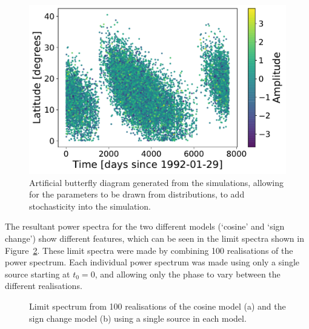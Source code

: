 \begin{figure}[ht!]
	\centering
	\includegraphics[width=0.85\columnwidth]{24h_fake_butterfly.pdf}
	\caption{Artificial butterfly diagram generated from the simulations, allowing for the parameters to be drawn from distributions, to add stochasticity into the simulation.}
	\label{fig:fake_butterfly}
\end{figure}


The resultant power spectra for the two different models (`cosine' and `sign change') show different features, which can be seen in the limit spectra shown in Figure~\ref{fig:artificial_LS}. These limit spectra were made by combining 100 realisations of the power spectrum. Each individual power spectrum was made using only a single source starting at $t_0 = 0$, and allowing only the phase to vary between the different realisations.

\begin{figure}[ht!]
	\centering
	\qquad
	\caption{Limit spectrum from 100 realisations of the cosine model (a) and the sign change model (b) using a single source in each model.}  \label{fig:artificial_LS}
\end{figure}


